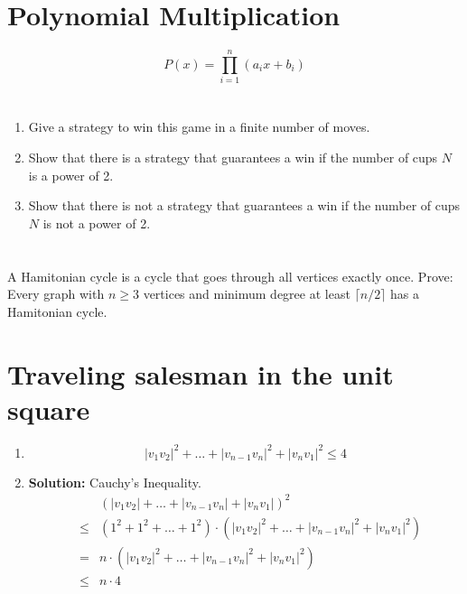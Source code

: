 \documentclass[a4paper]{article}
\begin{document}
\section{Polynomial Multiplication}
\[
P(x) = \prod_{i=1}^n(a_ix+b_i)
\]



\section{}
\begin{enumerate}
\item Give a strategy to win this game in a finite number of moves.
\item Show that there is a strategy that guarantees a win if the number of cups $N$ is a power of 2.
\item Show that there is not a strategy that guarantees a win if the number of cups $N$ is not a power of 2.
\end{enumerate} 

\section{}
\section{}
A Hamitonian cycle is a cycle that goes through all vertices exactly once. Prove: Every graph with $n\ge 3$ vertices and minimum degree at least $\lceil n/2 \rceil$ has a Hamitonian cycle.




\section{Traveling salesman in the unit square}
\begin{enumerate}
\item 
\[
|v_1v_2|^2+\dots+|v_{n-1}v_n|^2+|v_nv_1|^2 \le 4
\]
\item {\bf Solution:} Cauchy's Inequality.
\begin{eqnarray*}
&&(|v_1v_2|+\dots+|v_{n-1}v_n|+|v_nv_1|)^2 \\
&\le& (1^2+1^2+\dots+1^2)\cdot (|v_1v_2|^2+\dots+|v_{n-1}v_n|^2+|v_nv_1|^2) \\
&=& n\cdot (|v_1v_2|^2+\dots+|v_{n-1}v_n|^2+|v_nv_1|^2) \\
&\le& n\cdot 4
\end{eqnarray*}
\end{enumerate}
\end{document}
